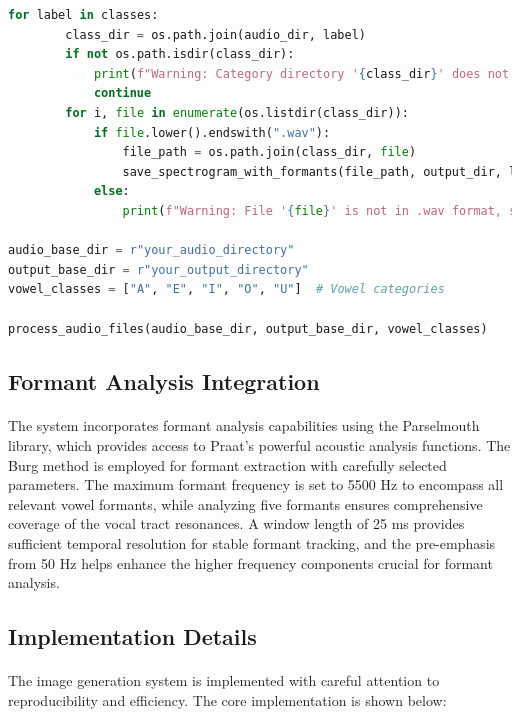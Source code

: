 \begin{lstlisting}[language=Python, caption={Spectrogram Generation with Formant Analysis}]
    for label in classes:
        class_dir = os.path.join(audio_dir, label)
        if not os.path.isdir(class_dir):
            print(f"Warning: Category directory '{class_dir}' does not exist, skipping processing.")
            continue
        for i, file in enumerate(os.listdir(class_dir)):
            if file.lower().endswith(".wav"):  
                file_path = os.path.join(class_dir, file)
                save_spectrogram_with_formants(file_path, output_dir, label, f"{label}_{i+1}")
            else:
                print(f"Warning: File '{file}' is not in .wav format, skipped.")

audio_base_dir = r"your_audio_directory"
output_base_dir = r"your_output_directory"
vowel_classes = ["A", "E", "I", "O", "U"]  # Vowel categories

process_audio_files(audio_base_dir, output_base_dir, vowel_classes)
\end{lstlisting}

\subsection{Formant Analysis Integration}
\label{subsec:formant-analysis}

\paragraph{}
The system incorporates formant analysis capabilities using the Parselmouth library, which provides access to Praat's powerful acoustic analysis functions. The Burg method is employed for formant extraction with carefully selected parameters. The maximum formant frequency is set to 5500 Hz to encompass all relevant vowel formants, while analyzing five formants ensures comprehensive coverage of the vocal tract resonances. A window length of 25 ms provides sufficient temporal resolution for stable formant tracking, and the pre-emphasis from 50 Hz helps enhance the higher frequency components crucial for formant analysis.

\subsection{Implementation Details}
\label{subsec:implementation-details}

\paragraph{}
The image generation system is implemented with careful attention to reproducibility and efficiency. The core implementation is shown below:

